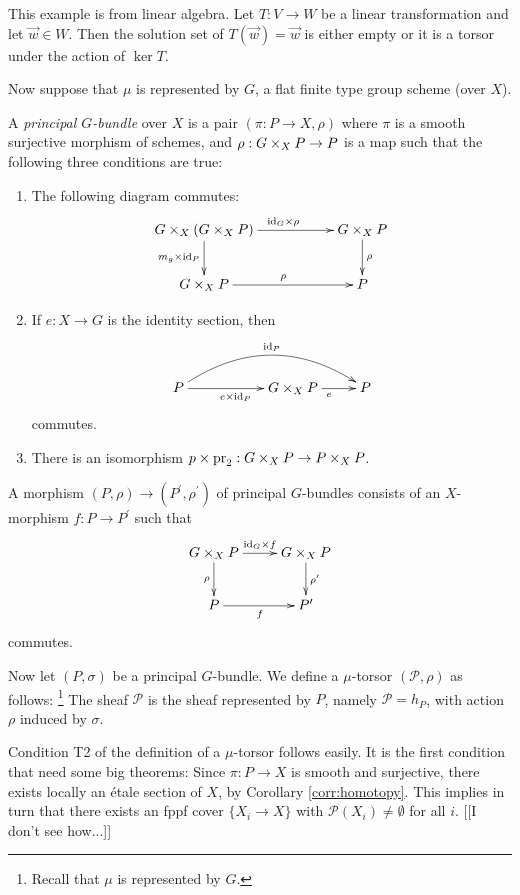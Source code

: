 \documentclass[11pt, english]{article}
\begin{document}
\begin{example}
This example is from linear algebra. Let $T:V \to W$ be a linear transformation and let $\vec w \in W$. Then the solution set of $T(\vec w)=\vec w$ is either empty or it is a torsor under the action of $\ker T$.
\end{example}

Now suppose that $\mu$ is represented by $G$, a flat finite type group scheme (over $X$). 

\begin{defi}
A \emph{principal $G$-bundle} over $X$ is a pair $(\pi:P \to X, \rho)$ where $\pi$ is a smooth surjective morphism of schemes, and $\rho:G\times_X P \to P$ is a map such that the following three conditions are true:
\begin{enumerate}
\item The following diagram commutes:
\[
\xymatrix{
G \X_X(G \X_X  P) \ar[rr]^{\id_G \times \rho} \ar[d]_{m_g \times \id_{ P}} && G \X_X  P \ar[d]^\rho \\
G \X_X  P \ar[rr]^\rho &&  P
}
\]
\item If $e:X \to G$ is the identity section, then
\[
\xymatrix{
 P \ar[rr]_{e \times \id_{ P}} \ar@/^2pc/[rrr]^{\id_{ P}} && G \times_X  P \ar[r]_e &  P
}
\]
commutes. 
\item
There is an isomorphism $p \times \mathrm{pr}_2: G \times_X  P \to  P \times_X  P$.
\end{enumerate}
A morphism $( P,\rho) \to ( P^\prime, \rho^\prime)$ of principal $G$-bundles consists of an $X$-morphism $f: P \to  P^\prime$ such that
\[
\xymatrix{
G \times_X  P \ar[r]^{\id_G \times f} \ar[d]_\rho & G \times_X  P \ar[d]^{\rho^\prime} \\
 P \ar[r]_f &  P^\prime 
}
\]
commutes.
\end{defi}

Now let $( P, \sigma)$  be a principal $G$-bundle. We define a $\mu$-torsor $(\mathcal P,\rho)$ as follows: \footnote{Recall that $\mu$ is represented by $G$.} The sheaf $\mathcal P$ is the sheaf represented by $P$, namely $\mathcal P = h_P$, with action $\rho$ induced by $\sigma$. 

Condition T2 of the definition of a $\mu$-torsor follows easily. It is the first condition that need some big theorems: Since $\pi: P \to X$ is smooth and surjective, there exists locally an étale section of $X$, by Corollary \ref{corr:homotopy}. This implies in turn that there exists an fppf cover $\{ X_i \to X\}$ with $\mathcal P(X_i) \neq \emptyset$ for all $i$. [[I don't see how...]]
\end{document}
